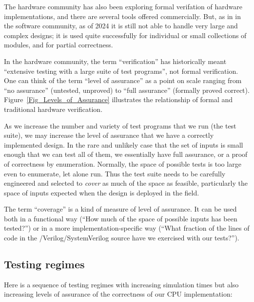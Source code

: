 The hardware community has also been exploring formal verifation of
hardware implementations, and there are several tools offered
commercially.  But, as in in the software community, as of 2024 it is
still not able to handle very large and complex designs; it is used
quite successfully for individual or small collections of modules, and
for partial correctness.

In the hardware community, the term ``verification'' has historically
meant ``extensive testing with a large suite of test programs'', not
formal verification.  One can think of the term ``level of assurance''
as a point on scale ranging from ``no assurance'' (untested, unproved)
to ``full assurance'' (formally proved correct).
Figure~\ref{Fig_Levels_of_Assurance} illustrates the relationship of
formal and traditional hardware verification.

As we increase the number and variety of test programs that we run
(the test suite), we may increase the level of assurance that we have
a correctly implemented design.  In the rare and unlikely case that
the set of inputs is small enough that we can test all of them, we
essentially have full assurance, or a proof of correctness by
enumeration.  Normally, the space of possible tests is too large even
to enumerate, let alone run.  Thus the test suite needs to be
carefully engineered and selected to \emph{cover} as much of the space
as feasible, particularly the space of inputs expected when the design
is deployed in the field.

The term ``coverage'' is a kind of measure of level of assurance.  It
can be used both in a functional way (``How much of the space of
possible inputs has been tested?'') or in a more
implementation-specific way (``What fraction of the lines of code in
the {\BSV}/Veri\-log/System\-Veri\-log source have we exercised with
our tests?'').


\subsection{Testing regimes}

Here is a sequence of testing regimes with increasing simulation times
but also increasing levels of assurance of the correctness of our CPU
implementation:

